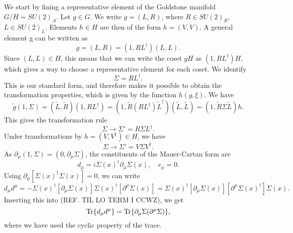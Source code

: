 We start by fining a representative element of the Goldstone manifold $G/H = SU(2)_A$.
Let $g\in G$. 
We write $g = (L, R)$, where $R \in SU(2)_R$, $L \in SU(2)_L$.
Elements $h \in H$ are then of the form $h = (V, V)$.
A general element g can be written as
\begin{equation}
    g = (L, R) = (1, R L^\dagger) (L, L).
\end{equation}
Since $(L, L) \in H$, this means that we can write the coset $g H$ as $(1, R L^\dagger)H$, which gives a way to choose a representative element for each coset.
We identify
\begin{equation}
    \Sigma = R L^\dagger. 
\end{equation}
This is our standard form, and therefore makes it possible to obtain the transformation properties, which is given by the function $h(g, \xi)$.
We have 
\begin{equation}
    \tilde g (1, \Sigma)
    = (\tilde L, \tilde R) (1, R L^\dagger)
    = (1, \tilde R (R L^\dagger) \tilde L^\dagger) (\tilde L, \tilde L)
    = (1, \tilde R \Sigma \tilde L) h.
\end{equation}
This gives the transformation rule
\begin{equation}
    \Sigma \rightarrow \Sigma' = R \Sigma L^\dagger.
\end{equation}
Under transformations by $h = (V, V^\dagger) \in H$, we have
\begin{equation}
    \Sigma \rightarrow \Sigma' = V \Sigma V^\dagger.
\end{equation}
As $\partial_\mu  (1, \Sigma) = (0, \partial_\mu \Sigma)$, the constituents of the Mauer-Cartan form are
\begin{equation}
    d_\mu = i \Sigma(x)^\dagger \partial_\mu \Sigma(x),\quad
    e_\mu = 0.
\end{equation}
Using $\partial_\mu [\Sigma(x)^\dagger\Sigma(x)] = 0 $, we can write
\begin{equation}
    d_\mu d^\mu = 
    - \Sigma(x)^\dagger [\partial_\mu \Sigma(x)] \Sigma(x)^\dagger [\partial^\mu \Sigma(x)]
    =\Sigma(x)^\dagger [\partial_\mu \Sigma(x)] [\partial^\mu \Sigma(x)^\dagger] \Sigma(x).
\end{equation}
Inserting this into (REF. TIL LO TERM I CCWZ), we get
\begin{equation}
    \Tr{d_\mu d^\mu} = \Tr{\partial_\mu \Sigma (\partial^\mu \Sigma)},
\end{equation}
where we have used the cyclic property of the trace.

